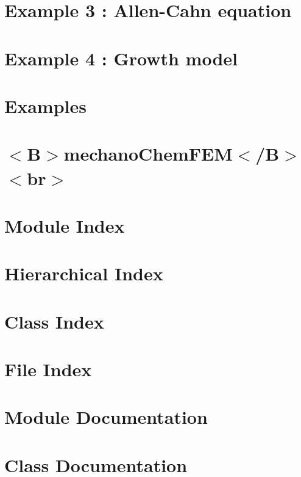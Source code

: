 \let\mypdfximage\pdfximage\def\pdfximage{\immediate\mypdfximage}\documentclass[twoside]{book}
\newcommand{\+}{\discretionary{\mbox{\scriptsize$\hookleftarrow$}}{}{}}
\begin{document}
\chapter{Example 3 \+: Allen-\/\+Cahn equation}
\label{_allen__cahn}

\chapter{Example 4 \+: Growth model}
\label{growth}

\chapter{Examples}
\label{examples}

\chapter{$<$B$>$mechano\+Chem\+F\+EM$<$/B$>$$<$br$>$}
\label{md_mechano_chem_f_e_m_doxygen_readme}

\chapter{Module Index}

\chapter{Hierarchical Index}

\chapter{Class Index}

\chapter{File Index}

\chapter{Module Documentation}


\chapter{Class Documentation}











\end{document}
